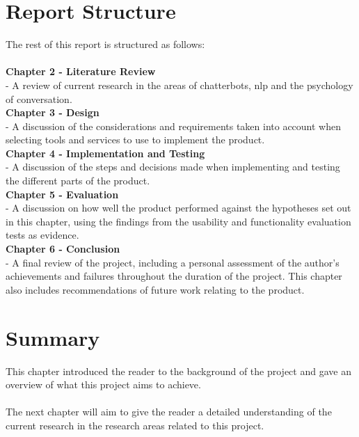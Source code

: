 \section{Report Structure}
The rest of this report is structured as follows:\\\\
\textbf{Chapter 2 - Literature Review}\\
- A review of current research in the areas of chatterbots, \gls{nlp} and the psychology of conversation.\\
\textbf{Chapter 3 - Design}\\
- A discussion of the considerations and requirements taken into account when selecting tools and services to use to implement the product.\\
\textbf{Chapter 4 - Implementation and Testing}\\
- A discussion of the steps and decisions made when implementing and testing the different parts of the product.\\
\textbf{Chapter 5 - Evaluation}\\
- A discussion on how well the product performed against the hypotheses set out in this chapter, using the findings from the usability and functionality evaluation tests as evidence.\\
\textbf{Chapter 6 - Conclusion}\\
- A final review of the project, including a personal assessment of the author's achievements and failures throughout the duration of the project. This chapter also includes recommendations of future work relating to the product.\\

\section{Summary}
This chapter introduced the reader to the background of the project and gave an overview of what this project aims to achieve.\\\\
The next chapter will aim to give the reader a detailed understanding of the current research in the research areas related to this project.

